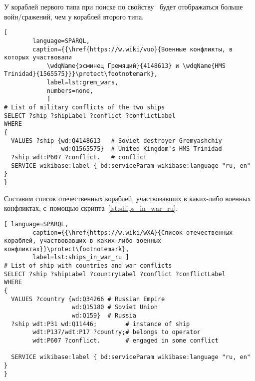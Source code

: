 У кораблей первого типа при поиске по свойству~ будет отображаться больше войн/сражений, чем у кораблей второго типа. 


\begin{lstlisting}[ 
        language=SPARQL, 
        caption={{\href{https://w.wiki/vuo}{Военные конфликты, в которых участвовали 
            \wdqName{эсминец Гремящий}{4148613} и \wdqName{HMS Trinidad}{1565575}}}\protect\footnotemark}, 
            label=lst:grem_wars, 
            numbers=none,
            ]
# List of military conflicts of the two ships 
SELECT ?ship ?shipLabel ?conflict ?conflictLabel
WHERE
{
  VALUES ?ship {wd:Q4148613   # Soviet destroyer Gremyashchiy
                wd:Q1565575}  # United Kingdom's HMS Trinidad
  ?ship wdt:P607 ?conflict.   # conflict
  SERVICE wikibase:label { bd:serviceParam wikibase:language "ru, en" }
}
\end{lstlisting}




\newpage
Составим список отечественных кораблей, 
участвовавших в каких-либо военных конфликтах, 
с~помощью скрипта~\ref{lst:ships_in_war_ru}.

\begin{lstlisting}[ language=SPARQL, 
        caption={{\href{https://w.wiki/wXA}{Список отечественных кораблей, участвовавших в каких-либо военных конфликтах}}\protect\footnotemark}, 
        label=lst:ships_in_war_ru ]
# List of ship with countries and war conflicts
SELECT ?ship ?shipLabel ?countryLabel ?conflict ?conflictLabel
WHERE
{
  VALUES ?country {wd:Q34266 # Russian Empire
                   wd:Q15180 # Soviet Union
                   wd:Q159}  # Russia
  ?ship wdt:P31 wd:Q11446;        # instance of ship
        wdt:P137/wdt:P17 ?country;# belongs to operator
        wdt:P607 ?conflict.       # engaged in some conflict

  SERVICE wikibase:label { bd:serviceParam wikibase:language "ru, en" }
}
\end{lstlisting}

